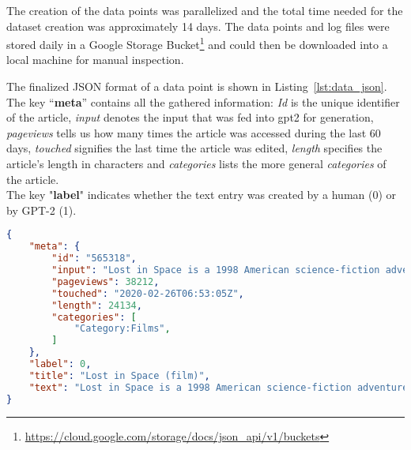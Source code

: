 The creation of the data points was parallelized and the total time needed for the dataset creation was approximately 14 days. The data points and log files were stored daily in a Google Storage Bucket\footnote{\url{https://cloud.google.com/storage/docs/json_api/v1/buckets}} and could then be downloaded into a local machine for manual inspection.

The finalized JSON format of a data point is shown in Listing~\ref{lst:data_json}. The key ``\textbf{meta}'' contains all the gathered information: \textit{Id} is the unique identifier of the article, \textit{input} denotes the input that was fed into \gls{gpt2} for generation, \textit{pageviews} tells us how many times the article was accessed during the last 60 days, \textit{touched} signifies the last time the article was edited, \textit{length} specifies the article's length in characters and \textit{categories} lists the more general \textit{categories} of the article. \\
The key "\textbf{label}" indicates whether the text entry was created by a human (0) or by GPT-2 (1).\\

\begin{lstlisting}[language=json,firstnumber=1,label={lst:data_json},caption={Example of a data point}]
{
	"meta": {
		"id": "565318",
		"input": "Lost in Space is a 1998 American science-fiction adventure",
		"pageviews": 38212,
		"touched": "2020-02-26T06:53:05Z",
		"length": 24134,
		"categories": [
			"Category:Films",
		]
	},
	"label": 0,
	"title": "Lost in Space (film)",
	"text": "Lost in Space is a 1998 American science-fiction adventure film directed by Stephen Hopkins, and starring William Hurt, Matt LeBlanc, and Gary Oldman. The plot is adapted from the 1965-1968 CBS television series \"of the same name\". Seve"
}
\end{lstlisting}